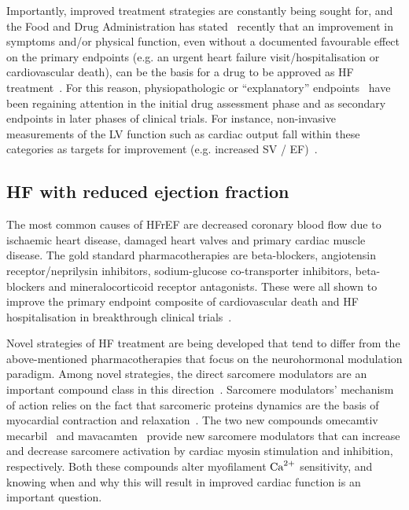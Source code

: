 \vspace{0.2cm}
Importantly, improved treatment strategies are constantly being sought for, and the Food and Drug Administration has stated~\cite{FDA:2019} recently that an improvement in symptoms and/or physical function, even without a documented favourable effect on the primary endpoints (e.g. an urgent heart failure visit/hospitalisation or cardiovascular death), can be the basis for a drug to be approved as HF treatment~\cite{Fiuzat:2020}. For this reason, physiopathologic or ``explanatory'' endpoints~\cite{Zanolla:2003} have been regaining attention in the initial drug assessment phase and as secondary endpoints in later phases of clinical trials. For instance, non-invasive measurements of the LV function such as cardiac output fall within these categories as targets for improvement (e.g. increased SV / EF)~\cite{Zanolla:2003}.


%
%
%
\subsection{HF with reduced ejection fraction}\label{sec:ch1HF_with_reduced_ejection_fraction}
The most common causes of HFrEF are decreased coronary blood flow due to ischaemic heart disease, damaged heart valves and primary cardiac muscle disease. The gold standard pharmacotherapies are beta-blockers, angiotensin receptor/neprilysin inhibitors, sodium-glucose co-transporter inhibitors, beta-blockers and mineralocorticoid receptor antagonists. These were all shown to improve the primary endpoint composite of cardiovascular death and HF hospitalisation in breakthrough clinical trials~\cite{Debska-Kozlowska:2021}.

\vspace{0.2cm}
Novel strategies of HF treatment are being developed that tend to differ from the above-mentioned pharmacotherapies that focus on the neurohormonal modulation paradigm. Among novel strategies, the direct sarcomere modulators are an important compound class in this direction~\cite{Tsukamoto:2020}. Sarcomere modulators' mechanism of action relies on the fact that sarcomeric proteins dynamics are the basis of myocardial contraction and relaxation~\cite{Solaro:1998}. The two new compounds omecamtiv mecarbil~\cite{Teerlink:2016} and mavacamten~\cite{Olivotto:2020} provide new sarcomere modulators that can increase and decrease sarcomere activation by cardiac myosin stimulation and inhibition, respectively. Both these compounds alter myofilament $\textrm{Ca}^{2+}$ sensitivity, and knowing when and why this will result in improved cardiac function is an important question.


